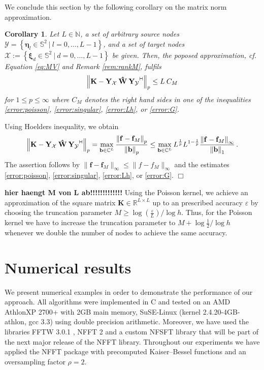\documentclass[11pt,a4paper,twoside,bibtotoc]{scrartcl}
\theoremstyle{plain}
\newtheorem{corollary}[theorem]{Corollary}
\theoremstyle{definition}
\theoremstyle{remark}
\newenvironment{proof}{{\bf Proof.}}{$\Box$}
\newcommand{\adj}{{\vdash \hspace*{-1.72mm} \dashv}}
\newcommand{\N}{\ensuremath{\mathbb{N}}}
\newcommand{\R}{\ensuremath{\mathbb{R}}}
\newcommand{\C}{\ensuremath{\mathbb{C}}}
\newcommand{\pset}[3]{\ensuremath{\left\{#1\ \left#2\ #3\right.\right\rbrace}}
\newcommand{\twosphere}{\ensuremath{\mathbb{S}^2}}
\newcommand{\mb}[1]{\mathbf{#1}}
\newcommand{\V}[1]{\mb{#1}}
\numberwithin{equation}{section}
\numberwithin{table}{section}
\numberwithin{figure}{section}
\begin{document}
We conclude this section by the following corollary on the matrix norm
approximation.
\begin{corollary}
  Let $L \in \N$, a set of arbitrary source nodes $\mathcal{Y} =
  \pset{\V{\eta}_{l} \in \twosphere}{|}{l = 0,\ldots,L-1}$, and a set of
  target nodes $\mathcal{X} := \pset{\V{\xi}_{d} \in
  \twosphere}{|}{d=0,\ldots,L-1}$ be given.
  Then, the poposed approximation, cf. Equation \eqref{eq:MV} and Remark
  \ref{rem:rankM}, fulfils
  \begin{equation*}
    \left\| \V{K} - \V{Y_{\mathcal{X}}} \: \V{\hat W} \:
      \V{Y_{\mathcal{Y}}}^{\adj} \right\|_p
    \le L \: C_M
  \end{equation*}
  for $1\le p \le \infty$ where $C_M$ denotes the right hand sides in one of
  the inequalities \eqref{error:poisson}, \eqref{error:singular},
  \eqref{error:Lh}, or \eqref{error:G}. 
\end{corollary}
\begin{proof}
 Using Hoelders inequality, we obtain
 \[
 \left\| \V{K} - \V{Y_{\mathcal{X}}} \: \V{\hat W} \:
   \V{Y_{\mathcal{Y}}}^{\adj} \right\|_p
 = \max_{\V{b}\in \C^L} \frac{\left\|\V{f} -
     \V{f}_{M}\right\|_{p}}{\left\|\V{b}\right\|_p}
 \le \max_{\V{b}\in \C^L} L^{\frac{1}{p}} L^{1-\frac{1}{p}} \frac{\left\|\V{f}
     - \V{f}_{M}\right\|_{\infty}}{\left\|\V{b}\right\|_1}\,.
 \]
 The assertion follows by $\|\V{f} - \V{f}_{M}\|_{\infty} \le
  \|f-f_M\|_{\infty}$ and the estimates
  \eqref{error:poisson}, \eqref{error:singular}, \eqref{error:Lh}, or
  \eqref{error:G}.
\end{proof}

{\bf hier haengt M von L ab!!!!!!!!!!!!!}
Using the Poisson kernel, we achieve an approximation of the square matrix
$\V{K}\in\R^{L\times L}$ up to an prescribed accuracy $\varepsilon$ by
choosing the truncation parameter $M\ge \log(\frac{\varepsilon}{L}) /\log h$.
Thus, for the Poisson kernel we have to increase the truncation parameter to
$M+\log\frac{1}{2} / \log h$ whenever we double the number of nodes to achieve
the same accuracy.

\section{Numerical results}

We present numerical examples in order to demonstrate the performance of
our approach. All algorithms were implemented in C and tested on an 
AMD Athlon\texttrademark XP 2700+ with 2GB main memory, SuSE-Linux 
(kernel 2.4.20-4GB-athlon, gcc 3.3) using double precision arithmetic. 
Moreover, we have used the libraries FFTW 3.0.1 \cite{fftw}, NFFT 2
\cite{kupo02C} and a custom NFSFT library that will be part of the next 
major release of the NFFT library. Throughout our experiments we have 
applied the NFFT package \cite{kupo02C} with precomputed Kaiser--Bessel 
functions and an oversampling factor $\rho=2$.
\end{document}
